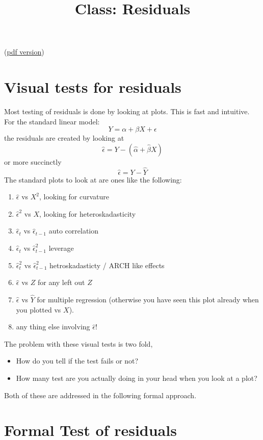 \documentclass[12pt]{article}
\begin{document}
\title{Class: Residuals}

(\href{class_residuals.pdf}{pdf version})

\section{Visual tests for residuals}

Most testing of residuals is done by looking at plots.  This is fast
and intuitive.  For the standard linear model:
\begin{displaymath}
Y = \alpha + \beta X + \epsilon
\end{displaymath}
the residuals are created by looking at
\begin{displaymath}
\hat\epsilon = Y - (\hat\alpha + \hat\beta X)
\end{displaymath}
or more succinctly
\begin{displaymath}
\hat\epsilon = Y - \hat Y
\end{displaymath}
The standard plots to look at are ones like the following:
\begin{enumerate}
\item $\hat\epsilon$ vs $X^2$, looking for curvature
\item $\hat\epsilon^2$ vs $X$, looking for heteroskadasticity
\item $\hat\epsilon_t$ vs $\hat\epsilon_{t-1}$ auto correlation
\item $\hat\epsilon_t$ vs $\hat\epsilon_{t-1}^2$ leverage
\item $\hat\epsilon_t^2$ vs $\hat\epsilon_{t-1}^2$ hetroskadasticty / ARCH like effects
\item $\hat\epsilon$ vs $Z$ for any left out $Z$
\item $\hat\epsilon$ vs $\hat Y$ for multiple regression (otherwise
you have seen this plot already when you plotted vs $X$).
\item any thing else involving $\hat\epsilon$!
\end{enumerate}
The problem with these visual tests is two fold, 
\begin{itemize}
\item How do you tell if the test fails or not?
\item How many test are you actually doing in your head when you look
at a plot?
\end{itemize}
Both of these are addressed in the following formal approach.

\section{Formal Test of residuals}
\end{document}
